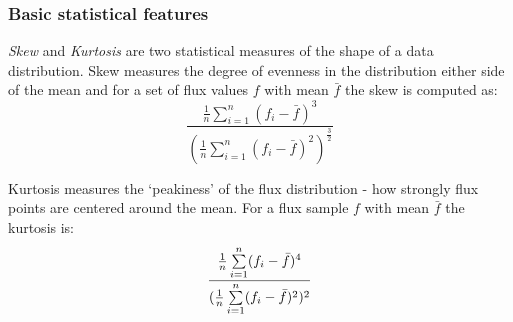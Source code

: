 \documentclass[10pt]{report}
\begin{document}
	

	\subsubsection{Basic statistical features}
	\emph{Skew} and \emph{Kurtosis} are two statistical measures of the shape of a data distribution. Skew measures the degree of evenness in the distribution either side of the mean and for a set of flux values $f$ with mean $\bar{f}$ the skew is computed as:
	\begin{equation}
		\frac{\frac{1}{n}\sum\limits^{n}_{i=1}(f_{i} - \bar{f})^{3}}
		{(\frac{1}{n}\sum\limits^{n}_{i=1}(f_{i} - \bar{f})^{2})^{\frac{3}{2}}}
	\end{equation}
	
	Kurtosis measures the `peakiness' of the flux distribution - how strongly flux points are centered around the mean. For a flux sample $f$ with mean $\bar{f}$ the kurtosis is:
	\begin{equation}
		\frac{\frac{1}{n}\sum\limits^{n}_{i=1}(f_{i} - \bar{f})^{4}}
		{(\frac{1}{n}\sum\limits^{n}_{i=1}(f_{i} - \bar{f})^{2})^{2}} \\
	\end{equation}
	
\end{document}
